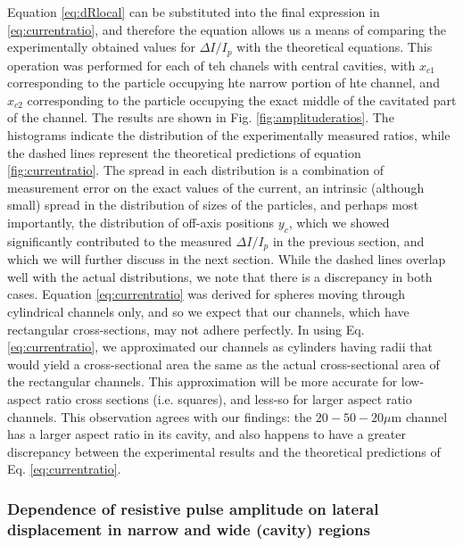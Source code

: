			Equation \ref{eq:dRlocal} can be substituted into the final expression in \ref{eq:currentratio}, and therefore the equation allows us a means of comparing the experimentally obtained values for $\Delta I/I_{p}$ with the theoretical equations. This operation was performed for each of teh chanels with central cavities, with $x_{c1}$ corresponding to the particle occupying hte narrow portion of hte channel, and $x_{c2}$ corresponding to the particle occupying the exact middle of the cavitated part of the channel. The results are shown in Fig. \ref{fig:amplituderatios}. The histograms indicate the distribution of the experimentally measured ratios, while the dashed lines represent the theoretical predictions of equation \ref{fig:currentratio}. The spread in each distribution is a combination of measurement error on the exact values of the current, an intrinsic (although small) spread in the distribution of sizes of the particles, and perhaps most importantly, the distribution of off-axis positions $y_{c}$, which we showed significantly contributed to the measured $\Delta I/I_{p}$ in the previous section, and which we will further discuss in the next section. While the dashed lines overlap well with the actual distributions, we note that there is a discrepancy in both cases. Equation \ref{eq:currentratio} was derived for spheres moving through cylindrical channels only, and so we expect that our channels, which have rectangular cross-sections, may not adhere perfectly. In using Eq. \ref{eq:currentratio}, we approximated our channels as cylinders having radii that would yield a cross-sectional area the same as the actual cross-sectional area of the rectangular channels. This approximation will be more accurate for low-aspect ratio cross sections (i.e. squares), and less-so for larger aspect ratio channels. This observation agrees with our findings: the $20-50-20 \mu\mathrm{m}$ channel has a larger aspect ratio in its cavity, and also happens to have a greater discrepancy between the experimental results and the theoretical predictions of Eq. \ref{eq:currentratio}.
			
		\subsubsection{Dependence of resistive pulse amplitude on lateral displacement in narrow and wide (cavity) regions}
		    

